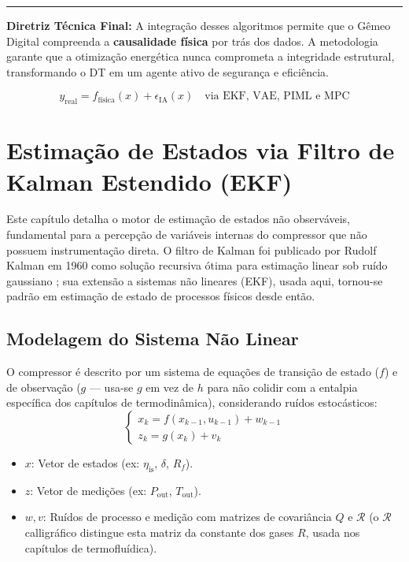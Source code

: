 \documentclass[12pt,a4paper]{article}
\numberwithin{equation}{section}
\numberwithin{table}{section}
\numberwithin{figure}{section}
\begin{document}
	\vspace{1em}
	\hrule
	\vspace{1em}
	
	\textbf{Diretriz Técnica Final:} A integração desses algoritmos permite que o Gêmeo Digital compreenda a \textbf{causalidade física} por trás dos dados. A metodologia garante que a otimização energética nunca comprometa a integridade estrutural, transformando o DT em um agente ativo de segurança e eficiência.
	
	\begin{equation}\label{eq:s20-9}
 \boxed{y_{\text{real}} = f_{\text{física}}(x) + \epsilon_{\text{IA}}(x) \quad \text{via EKF, VAE, PIML e MPC}} 
\end{equation}


	
	\section{Estimação de Estados via Filtro de Kalman Estendido (EKF)}

	Este capítulo detalha o motor de estimação de estados não observáveis, fundamental para a percepção de variáveis internas do compressor que não possuem instrumentação direta. O filtro de Kalman foi publicado por Rudolf Kalman em 1960 como solução recursiva ótima para estimação linear sob ruído gaussiano \cite{kalman}; sua extensão a sistemas não lineares (EKF), usada aqui, tornou-se padrão em estimação de estado de processos físicos desde então.
	
	\subsection{Modelagem do Sistema Não Linear}
	O compressor é descrito por um sistema de equações de transição de estado ($f$) e de observação ($g$ — usa-se $g$ em vez de $h$ para não colidir com a entalpia específica dos capítulos de termodinâmica), considerando ruídos estocásticos:
	\begin{equation}\label{eq:s21-1}
	\begin{cases}
		x_k = f(x_{k-1}, u_{k-1}) + w_{k-1} \\
		z_k = g(x_k) + v_k
	\end{cases}
\end{equation}
	\begin{itemize}
		\item $x$: Vetor de estados (ex: $\eta_{\text{is}}$, $\delta$, $R_f$).
		\item $z$: Vetor de medições (ex: $P_{\text{out}}$, $T_{\text{out}}$).
		\item $w, v$: Ruídos de processo e medição com matrizes de covariância $Q$ e $\mathcal{R}$ (o $\mathcal{R}$ calligráfico distingue esta matriz da constante dos gases $R$, usada nos capítulos de termofluídica).
	\end{itemize}
\end{document}
